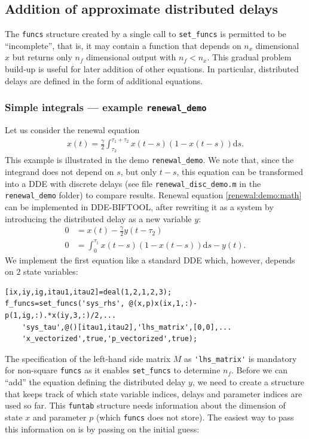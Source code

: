\documentclass[10pt]{scrartcl}
\newcommand{\DDEBIFCODE}{\textsc{DDE-BIFTOOL}}
\renewcommand{\d}{\mathrm{d}}
\newcommand{\blist}[1]{\mbox{\lstinline!#1!}}
\begin{document}
\subsection{Addition of approximate distributed delays}
\label{sec:dist_delays}
The \blist{funcs} structure created by a single call to
\blist{set_funcs} is permitted to be ``incomplete'', that is, it may
contain a function that depends on $n_x$ dimensional $x$ but returns only
$n_f$ dimensional output with $n_f<n_x$. This gradual problem build-up
is useful for later addition of other equations. In particular,
distributed delays are defined in the form of additional equations.
\subsubsection{Simple integrals --- example \blist{renewal_demo}}
\label{sec:distdelay:simple}
Let us consider the renewal equation \cite{breda2016numerical}
\begin{align}
  \label{renewal:demo:math}
  x(t)=\frac{\gamma}{2}\int_{\tau_2}^{\tau_1+\tau_2}x(t-s)(1-x(t-s))\d s.
\end{align}
This example is illustrated in the demo \blist{renewal_demo}. We note
that, since the integrand does not depend on $s$, but only $t-s$, this
equation can be transformed into a DDE with discrete delays (see file
\texttt{renewal\_disc\_demo.m} in the \texttt{renewal\_demo} folder)
to compare results.  Renewal equation \eqref{renewal:demo:math}  can be implemented in
{\DDEBIFCODE}, after rewriting it as a system by introducing the distributed delay as a new variable $y$:
\begin{align}
  0&=x(t)-\frac{\gamma}{2}y(t-\tau_2)\label{renewal:dde}\\
  0&=\int_0^{\tau_1}x(t-s)(1-x(t-s))\d s-y(t).\label{renewal:dist}
\end{align}
We implement the first equation like a standard DDE which, however, depends on $2$ state variables:
\begin{lstlisting}
[ix,iy,ig,itau1,itau2]=deal(1,2,1,2,3);
f_funcs=set_funcs('sys_rhs', @(x,p)x(ix,1,:)-p(1,ig,:).*x(iy,3,:)/2,...
    'sys_tau',@()[itau1,itau2],'lhs_matrix',[0,0],...
    'x_vectorized',true,'p_vectorized',true);  
\end{lstlisting}
The specification of the left-hand side matrix $M$ as \blist{'lhs_matrix'} is mandatory for
non-square \blist{funcs} as it enables \blist{set_funcs} to determine
$n_f$. Before we can ``add'' the equation defining the distributed delay $y$, we need to create a structure that keeps track of which state variable indices, delays and parameter indices are used so far. This \blist{funtab} structure needs information about the dimension of state $x$ and parameter $p$ (which \blist{funcs} does not store). The easiest way to pass this information on is by passing on the initial guess:
\end{document}
